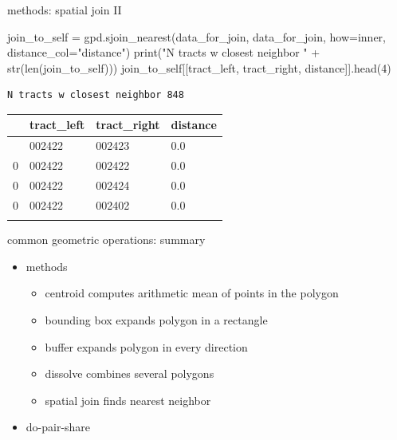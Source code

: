 \documentclass[
  ignorenonframetext,
]{beamer}
\newenvironment{Shaded}{\begin{snugshade}}{\end{snugshade}}
\newcommand{\BuiltInTok}[1]{\textcolor[rgb]{0.00,0.23,0.31}{#1}}
\newcommand{\DecValTok}[1]{\textcolor[rgb]{0.68,0.00,0.00}{#1}}
\newcommand{\NormalTok}[1]{\textcolor[rgb]{0.00,0.23,0.31}{#1}}
\newcommand{\OperatorTok}[1]{\textcolor[rgb]{0.37,0.37,0.37}{#1}}
\newcommand{\StringTok}[1]{\textcolor[rgb]{0.13,0.47,0.30}{#1}}
\providecommand{\tightlist}{%
  \setlength{\itemsep}{0pt}\setlength{\parskip}{0pt}}\usepackage{longtable,booktabs,array}
\begin{document}
\begin{frame}[fragile]{methods: spatial join II}
\label{methods-spatial-join-ii}
\begin{Shaded}
\begin{Highlighting}[]
\NormalTok{join\_to\_self }\OperatorTok{=}\NormalTok{ gpd.sjoin\_nearest(data\_for\_join, data\_for\_join, how}\OperatorTok{=}\StringTok{\textquotesingle{}inner\textquotesingle{}}\NormalTok{, distance\_col}\OperatorTok{=}\StringTok{"distance"}\NormalTok{)}
\BuiltInTok{print}\NormalTok{(}\StringTok{"N tracts w closest neighbor "} \OperatorTok{+} \BuiltInTok{str}\NormalTok{(}\BuiltInTok{len}\NormalTok{(join\_to\_self)))}
\NormalTok{join\_to\_self[[}\StringTok{\textquotesingle{}tract\_left\textquotesingle{}}\NormalTok{, }\StringTok{\textquotesingle{}tract\_right\textquotesingle{}}\NormalTok{, }\StringTok{\textquotesingle{}distance\textquotesingle{}}\NormalTok{]].head(}\DecValTok{4}\NormalTok{)}
\end{Highlighting}
\end{Shaded}

\begin{verbatim}
N tracts w closest neighbor 848
\end{verbatim}

\begin{longtable}[]{@{}llll@{}}
\toprule\noalign{}
& tract\_left & tract\_right & distance \\
\midrule\noalign{}
\endhead
0 & 002422 & 002423 & 0.0 \\
0 & 002422 & 002422 & 0.0 \\
0 & 002422 & 002424 & 0.0 \\
0 & 002422 & 002402 & 0.0 \\
\bottomrule\noalign{}
\end{longtable}
\end{frame}

\begin{frame}{common geometric operations: summary}
\label{common-geometric-operations-summary}
\begin{itemize}
\tightlist
\item
  methods

  \begin{itemize}
  \tightlist
  \item
    centroid computes arithmetic mean of points in the polygon
  \item
    bounding box expands polygon in a rectangle
  \item
    buffer expands polygon in every direction
  \item
    dissolve combines several polygons
  \item
    spatial join finds nearest neighbor
  \end{itemize}
\item
  do-pair-share
\end{itemize}
\end{frame}
\end{document}
